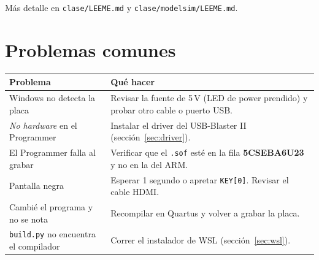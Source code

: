 \documentclass[11pt,a4paper]{article}
\newcommand{\code}[1]{\texttt{#1}}
\begin{document}
Más detalle en \code{clase/LEEME.md} y \code{clase/modelsim/LEEME.md}.

\section{Problemas comunes}

\begin{center}
\begin{tabularx}{\linewidth}{lL}
\toprule
Problema & Qué hacer \\
\midrule
Windows no detecta la placa & Revisar la fuente de 5\,V (LED de power prendido) y probar otro cable o puerto USB. \\
\emph{No hardware} en el Programmer & Instalar el driver del USB-Blaster II (sección~\ref{sec:driver}). \\
El Programmer falla al grabar & Verificar que el \code{.sof} esté en la fila \textbf{5CSEBA6U23} y no en la del ARM. \\
Pantalla negra & Esperar 1 segundo o apretar \code{KEY[0]}. Revisar el cable HDMI. \\
Cambié el programa y no se nota & Recompilar en Quartus y volver a grabar la placa. \\
\code{build.py} no encuentra el compilador & Correr el instalador de WSL (sección~\ref{sec:wsl}). \\
\bottomrule
\end{tabularx}
\end{center}
\end{document}
